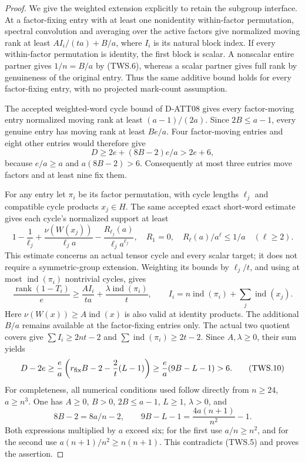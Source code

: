 \begin{proof}
We give the weighted extension explicitly to retain the subgroup
interface. At a factor-fixing entry with at least one nonidentity
within-factor permutation, spectral convolution and averaging over
the active factors give normalized moving rank at least
\(AI_i/(ta)+B/a\), where \(I_i\) is its natural block index.
If every within-factor permutation is identity, the first block is
scalar. A nonscalar entire partner gives \(1/n=B/a\) by (TWS.6),
whereas a scalar partner gives full rank by genuineness of the
original entry. Thus the same additive bound holds for every
factor-fixing entry, with no projected mark-count assumption.

The accepted weighted-word cycle bound of D-ATT08 gives every
factor-moving entry normalized moving rank at least
\((a-1)/(2a)\). Since \(2B\le a-1\), every genuine entry
has moving rank at least \(Be/a\). Four factor-moving entries
and eight other entries would therefore give
\[
 D\ge2e+(8B-2)e/a>2e+6,
 \tag{TWS.7}
\]
because \(e/a\ge a\) and \(a(8B-2)>6\).
Consequently at most three entries move factors and at least nine
fix them.

For any entry let \(\pi_i\) be its factor permutation, with cycle
lengths \(\ell_j\) and compatible cycle products \(x_j\in H\).
The same accepted exact short-word estimate gives each cycle's
normalized support at least
\[
 1-\frac1{\ell_j}
   +\frac{\nu(W(x_j))}{\ell_j a}
   -\frac{R_{\ell_j}(a)}{\ell_j a^{\ell_j}},
 \quad R_1=0,\quad
 R_{\ell}(a)/a^\ell\le1/a\quad(\ell\ge2).
 \tag{TWS.8}
\]
This estimate concerns an actual tensor cycle and every scalar target;
it does not require a symmetric-group extension. Weighting its bounds
by \(\ell_j/t\), and using at most \(\operatorname{ind}(\pi_i)\)
nontrivial cycles, gives
\[
 \frac{\operatorname{rank}(1-T_i)}e
  \ge\frac{AI_i}{ta}
       +\frac{\lambda\operatorname{ind}(\pi_i)}t,
 \qquad I_i=n\operatorname{ind}(\pi_i)+
                         \sum_j\operatorname{ind}(x_j).
 \tag{TWS.9}
\]
Here \(\nu(W(x))\ge A\operatorname{ind}(x)\) is also valid
at identity products. The additional \(B/a\) remains available
at the factor-fixing entries only. The actual two quotient covers
give \(\sum I_i\ge2nt-2\) and
\(\sum\operatorname{ind}(\pi_i)\ge2t-2\).
Since \(A,\lambda\ge0\), their sum yields
\[
 D-2e\ge\frac ea
       \left(r_{\rm fix}B-2-\frac2t(L-1)\right)
 \ge\frac ea(9B-L-1)>6.
 \tag{TWS.10}
\]
For completeness, all numerical conditions used follow directly from
\(n\ge24\), \(a\ge n^3\). One has \(A\ge0\), \(B>0\),
\(2B\le a-1\), \(L\ge1\), \(\lambda>0\), and
\[
 8B-2=8a/n-2,\qquad
 9B-L-1=\frac{4a(n+1)}{n^2}-1.
 \tag{TWS.11}
\]
Both expressions multiplied by \(a\) exceed six; for the first
use \(a/n\ge n^2\), and for the second use
\(a(n+1)/n^2\ge n(n+1)\).
This contradicts (TWS.5) and proves the assertion.
\end{proof}

